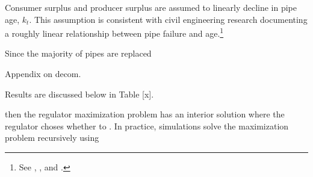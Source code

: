 \documentclass[12pt,table]{article}
\begin{document}

Consumer surplus and producer surplus are assumed to linearly decline in pipe age, $k_t$.  This assumption is consistent with civil engineering research documenting a roughly linear relationship between pipe failure and age.\footnote{See \cite{ward2017deterioration}, \cite{kleiner2001comprehensive}, and \cite{aydogdu2015estimation}.}  




Since the majority of pipes are replaced 

Appendix on decom.




Results are discussed below in Table [x].

 then the regulator maximization problem has an interior solution where the regulator choses whether to .  In practice, simulations solve the maximization problem recursively using 



\end{document}
